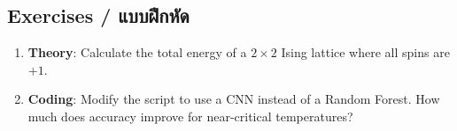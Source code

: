 \subsection{Exercises \quad / \quad \textthai{แบบฝึกหัด}}
\begin{enumerate}
    \item \textbf{Theory}: Calculate the total energy of a $2 \times 2$ Ising lattice where all spins are $+1$.
    \item \textbf{Coding}: Modify the script to use a CNN instead of a Random Forest. How much does accuracy improve for near-critical temperatures?
\end{enumerate}
